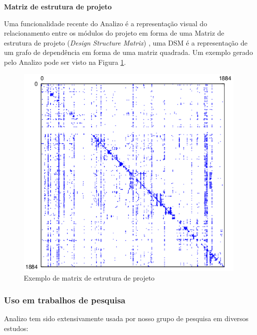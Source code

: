 {\bf Matriz de estrutura de projeto}

Uma funcionalidade recente do Analizo é a representação visual do
relacionamento entre os módulos do projeto em forma de uma Matriz de estrutura
de projeto ({\it Design Structure Matrix}) \cite{Maccormack2006}, uma DSM é a
representação de um grafo de dependência em forma de uma matriz quadrada. Um
exemplo gerado pelo Analizo pode ser visto na Figura \ref{sample-dsm}.

\begin{figure}[h]
\center
\includegraphics[scale=0.3]{imagens/sample-dsm.png}
\caption{Exemplo de matrix de estrutura de projeto}
\label{sample-dsm}
\end{figure}

\subsubsection{Uso em trabalhos de pesquisa}
\label{trabalhos-analizo}

Analizo tem sido extensivamente usada por nosso grupo de pesquisa em diversos
estudos:

